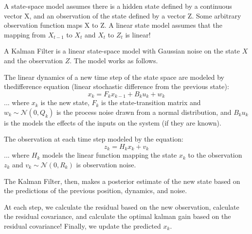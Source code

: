 \documentclass[letterpaper, 10pt]{article}
\begin{document}
A state-space model assumes there is a hidden state defined by a continuous vector X, and an observation of the state defined by a vector Z. Some arbitrary observation function maps X to Z. A linear state model assumes that the mapping from $X_{t-1}$ to $X_t$ and $X_t$ to $Z_t$ is linear!

A Kalman Filter is a linear state-space model with Gaussian noise on the state $X$ and the observation $Z$. The model works as follows.

The linear dynamics of a new time step of the state space are modeled by thedifference equation (linear stochastic difference from the previous state): 
$$ x_k = F_k x_{k-1} + B_k u_k+ w_k $$
... where $x_k$ is the new state, $F_k$ is the state-transition matrix and $w_k \sim \mathcal{N}(0, Q_k)$ is the process noise drawn from a normal distribution, and $B_k u_k$ is the models the effects of the inputs on the system (if they are known). 

The observation at each time step modeled by the equation: 
$$ z_k = H_k x_k + v_k $$
... where $H_k$ models the linear function mapping the state $x_k$ to the observation $z_k$ and $v_k \sim \mathcal{N}(0,R_k)$ is observation noise.

The Kalman Filter, then, makes a posterior estimate of the new state based on the predictions of the previous position, dynamics, and noise.

At each step, we calculate the residual based on the new observation, calculate the residual covariance, and calculate the optimal kalman gain based on the residual covariance! Finally, we update the predicted $x_k$.
\end{document}

